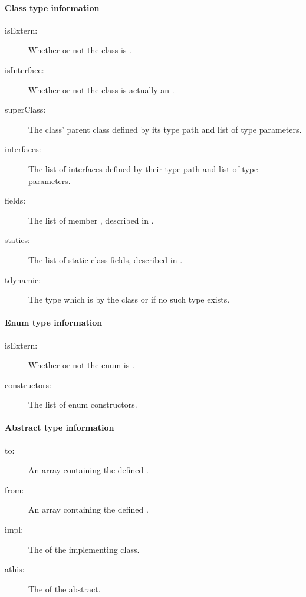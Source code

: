 \paragraph{Class type information}
\label{cr-rtti-class-type-information}

\begin{description}
	\item[isExtern:] Whether or not the class is .
	\item[isInterface:] Whether or not the class is actually an .
	\item[superClass:] The class' parent class defined by its type path and list of type parameters.
	\item[interfaces:] The list of interfaces defined by their type path and list of type parameters.
	\item[fields:] The list of member , described in .
	\item[statics:] The list of static class fields, described in .
	\item[tdynamic:] The type which is  by the class or  if no such type exists.
\end{description}

\paragraph{Enum type information}

\begin{description}
	\item[isExtern:] Whether or not the enum is .
	\item[constructors:] The list of enum constructors.
\end{description}

\paragraph{Abstract type information}

\begin{description}
	\item[to:] An array containing the defined .
	\item[from:] An array containing the defined .
	\item[impl:] The  of the implementing class.
	\item[athis:] The  of the abstract.
\end{description}
	
